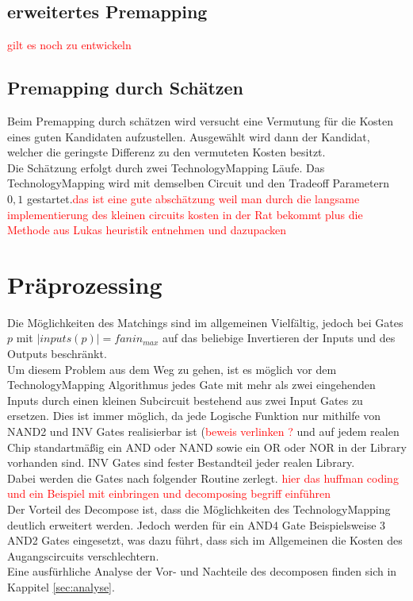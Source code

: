 \documentclass[11pt, a4paper, german]{article}
\newcommand{\TM}{TechnologyMapping }
\begin{document}
 
\subsection{erweitertes Premapping}
\label{subsec:erweitertes_premapping}
\textcolor{red}{gilt es noch zu entwickeln} 
 
 
\subsection{Premapping durch Schätzen}
\label{subsec:neinhierfrnochkeinlabel}
 Beim Premapping durch schätzen wird versucht eine Vermutung für die Kosten eines guten Kandidaten aufzustellen. Ausgewählt wird dann der Kandidat, welcher die geringste Differenz zu den vermuteten Kosten besitzt.\\
 Die Schätzung erfolgt durch zwei \TM Läufe. Das \TM wird mit demselben Circuit  und den Tradeoff Parametern $0,1$ gestartet.\textcolor{red}{das ist eine gute abschätzung weil man durch die langsame implementierung des kleinen circuits kosten in der Rat bekommt plus die Methode aus Lukas heuristik entnehmen und dazupacken}


\section{Präprozessing}
Die Möglichkeiten des Matchings sind im allgemeinen Vielfältig, jedoch bei Gates $p$ mit $|inputs(p)| = fanin_{max}$ auf das beliebige Invertieren der Inputs und des Outputs beschränkt. \\
Um diesem Problem aus dem Weg zu gehen, ist es möglich vor dem \TM Algorithmus jedes Gate mit mehr als zwei eingehenden Inputs durch einen kleinen Subcircuit bestehend aus zwei Input Gates zu ersetzen. Dies ist immer möglich, da jede Logische Funktion nur mithilfe von NAND2 und INV Gates realisierbar ist (\textcolor{red}{beweis verlinken ?} und auf jedem realen Chip standartmäßig ein AND oder NAND sowie ein OR oder NOR in der Library vorhanden sind. INV Gates sind fester Bestandteil jeder realen Library.\\
Dabei werden die Gates nach folgender Routine zerlegt. \textcolor{red}{hier das huffman coding und ein Beispiel mit einbringen und decomposing begriff einführen}\\
Der Vorteil des Decompose ist, dass die Möglichkeiten des \TM deutlich erweitert werden. Jedoch werden für ein AND4 Gate Beispielsweise 3 AND2 Gates eingesetzt, was dazu führt, dass sich im Allgemeinen die Kosten des Augangscircuits verschlechtern.\\
Eine ausfürhliche Analyse der Vor- und Nachteile des decomposen finden sich in Kappitel \ref{sec:analyse}.
	
\end{document}
